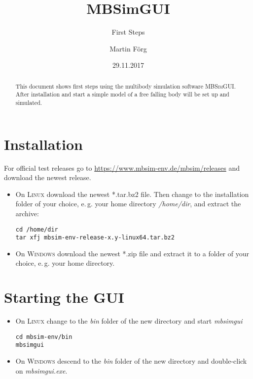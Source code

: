 \documentclass[
a4paper,
fleqn,
DIV=15,
pagesize
]{scrartcl}
\begin{document}
\subject{MBSim -- Environment}
\title{MBSimGUI}
\subtitle{First Steps}
\author{Martin Förg}
\date{29.11.2017}

\maketitle

\begin{abstract}
This document shows first steps using the multibody simulation software
\textsc{MBSimGUI}. After installation and start a
simple model of a free falling body will be set up and simulated.
\end{abstract}


\tableofcontents


\section{Installation}
For official test releases go to \url{https://www.mbsim-env.de/mbsim/releases}
and download the newest release.
\begin{itemize}
\item On \textsc{Linux}
download the newest *.tar.bz2 file.
Then change to the installation folder of your choice, e.\,g. your home directory
\emph{/home/dir}, and extract the archive:
\begin{verbatim}
cd /home/dir
tar xfj mbsim-env-release-x.y-linux64.tar.bz2
\end{verbatim}

\item On \textsc{Windows}
download the newest *.zip file
and extract it to a folder of your choice, e.\,g. your home directory.
\end{itemize}

\section{Starting the GUI}

\begin{itemize}
\item On \textsc{Linux} change to the \emph{bin} folder of the new directory and start
\emph{mbsimgui}
\begin{verbatim}
cd mbsim-env/bin
mbsimgui
\end{verbatim}

\item On \textsc{Windows}
descend to the \emph{bin} folder of the new directory and double-click on
\emph{mbsimgui.exe}.
\end{itemize}
\end{document}
